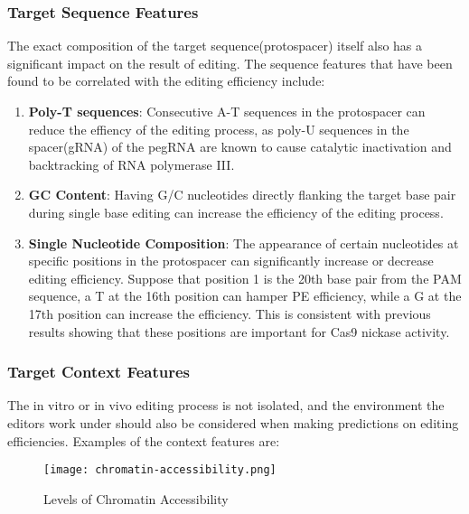 \documentclass[12pt]{article}
\begin{document}
\subsubsection{Target Sequence Features}

The exact composition of the target sequence(protospacer) itself also has a significant impact on the result of editing. The sequence features that have been found to be correlated with the editing efficiency include:

\begin{enumerate}
    \item \textbf{Poly-T sequences}: Consecutive A-T sequences in the protospacer can reduce the effiency of the editing process, as poly-U sequences in the spacer(gRNA) of the pegRNA are known to cause catalytic inactivation and backtracking of RNA polymerase III\cite{mathisPredictingPrimeEditing2023}.
    \item \textbf{GC Content}: Having G/C nucleotides directly flanking the target base pair during single base editing can increase the efficiency of the editing process\cite{mathisPredictingPrimeEditing2023}.
    \item \textbf{Single Nucleotide Composition}: The appearance of certain nucleotides at specific positions in the protospacer can significantly increase or decrease editing efficiency. Suppose that position 1 is the 20th base pair from the PAM sequence, a T at the 16th position can hamper PE efficiency, while a G at the 17th position can increase the efficiency\cite{kimPredictingEfficiencyPrime2021a}. This is consistent with previous results showing that these positions are important for Cas9 nickase activity\cite{doenchOptimizedSgRNADesign2016}.
\end{enumerate}



\subsubsection{Target Context Features}

The in vitro or in vivo editing process is not isolated, and the environment the editors work under should also be considered when making predictions on editing efficiencies. Examples of the context features are:

\begin{figure}[ht]
    \centering
    \texttt{[image: chromatin-accessibility.png]}
    \caption{Levels of Chromatin Accessibility\cite{klemmChromatinAccessibilityRegulatory2019}}
    \label{fig:chromatin}
\end{figure}
\end{document}
